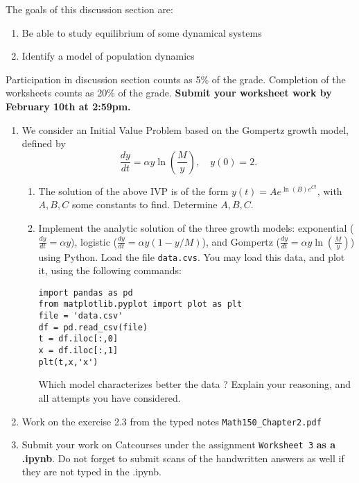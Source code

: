 \documentclass[11pt]{article}
\begin{document}
The goals of this discussion section are: 

\begin{enumerate}
\item Be able to study equilibrium of some dynamical systems
\item Identify a model of population dynamics
\end{enumerate}

Participation in discussion section counts as 5\% of the grade. Completion of the worksheets counts as 20\% of the grade. \textbf{Submit your worksheet work by February 10th at 2:59pm.}

\begin{enumerate}
\item We consider an Initial Value Problem based on the Gompertz growth model, defined by
\[ \frac{d y}{d t} = \alpha y \ln \left( \frac{M}{y} \right), \quad y(0) = 2.
\]
\begin{enumerate}
\item The solution of the above IVP is of the form $y(t)  = A e^{\ln(B) e^{C t}}$, with $A,B,C$ some constants to find. Determine $A,B,C$.
\item Implement the analytic solution of the three growth models: exponential ($\frac{d y}{d t} = \alpha y$), logistic ($\frac{d y}{d t} = \alpha y(1 - y/M)$), and Gompertz ($ \frac{d y}{d t} = \alpha y \ln \left( \frac{M}{y} \right)$) using Python. Load the file {\tt data.cvs}. You may load this data, and plot it, using the following commands:
\begin{verbatim}
import pandas as pd
from matplotlib.pyplot import plot as plt
file = 'data.csv'
df = pd.read_csv(file)
t = df.iloc[:,0]
x = df.iloc[:,1]
plt(t,x,'x')
 \end{verbatim}
Which model characterizes better the data ? Explain your reasoning, and all attempts you have considered.
\end{enumerate}
\item Work on the exercise 2.3 from the typed notes \texttt{Math150\_Chapter2.pdf} 
\item Submit your work on Catcourses under the assignment \texttt{Worksheet 3} \textbf{as a .ipynb}. Do not forget to submit scans of the handwritten answers as well if they are not typed in the .ipynb.

\end{enumerate}
\end{document}
